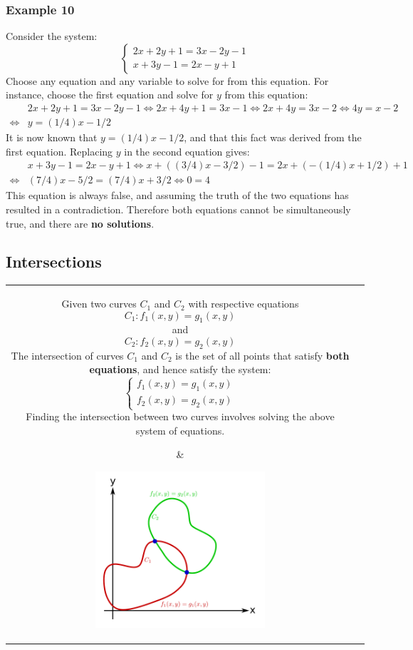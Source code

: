 \documentclass{article}
\begin{document}
\subsubsection*{Example 10}

Consider the system:
\[\left\{\begin{array}{c} 
2x + 2y + 1 = 3x - 2y - 1 \\
x + 3y - 1 = 2x - y + 1
\end{array}\right.\] 
Choose any equation and any variable to solve for from this equation. For instance, choose the first equation and solve for \(y\) from this equation: 
\begin{align*}
& 2x + 2y + 1 = 3x - 2y - 1 
\iff 2x + 4y + 1 = 3x - 1 
\iff 2x + 4y = 3x - 2
\iff 4y = x - 2 \\
\iff & y = (1/4)x - 1/2
\end{align*}
It is now known that \(y = (1/4)x - 1/2\), and that this fact was derived from the first equation. Replacing \(y\) in the second equation gives: 
\begin{align*}
& x + 3y - 1 = 2x - y + 1 
\iff x + ((3/4)x - 3/2) - 1 = 2x + (-(1/4)x + 1/2) + 1 \\
\iff & (7/4)x - 5/2 = (7/4)x + 3/2 
\iff 0 = 4
\end{align*}
This equation is always false, and assuming the truth of the two equations has resulted in a contradiction. Therefore both equations cannot be simultaneously true, and there are {\bf no solutions}.



\subsection*{Intersections}

\begin{tabular}{cc}
\parbox{0.5\textwidth}{
Given two curves \(C_1\) and \(C_2\) with respective equations 
\[C_1 : f_1(x, y) = g_1(x, y)\]
and
\[C_2 : f_2(x, y) = g_2(x, y)\]
The intersection of curves \(C_1\) and \(C_2\) is the set of all points that satisfy {\bf both equations}, and hence satisfy the system:
\[\left\{\begin{array}{c}
f_1(x, y) = g_1(x, y) \\
f_2(x, y) = g_2(x, y)
\end{array}\right.\]
Finding the intersection between two curves involves solving the above system of equations.
} & \parbox{0.5\textwidth}{
\includegraphics[width = 0.5\textwidth]{intersecting_curves}
}
\end{tabular}
\end{document}
